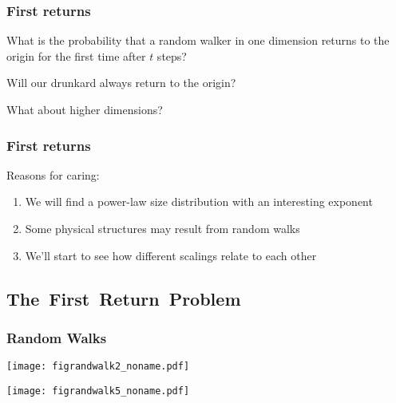 


\begin{frame}
  \frametitle{First returns}

  What is the probability that a random walker
  in one dimension returns to the origin
  for the first time after $t$ steps?

  Will our drunkard always return to the origin?

  What about higher dimensions?

\end{frame}

\begin{frame}
  \frametitle{First returns}

  \begin{block}{Reasons for caring:}
    \begin{enumerate}
    \item<2-> 
      We will find a power-law size distribution
      with an interesting exponent
    \item<3-> 
      Some physical structures may result from random walks
    \item<4-> 
      We'll start to see how different scalings relate to each other
    \end{enumerate}
  \end{block}

\end{frame}


\subsection{The\ First\ Return\ Problem}

\begin{frame}
  \frametitle{Random Walks}

  \texttt{[image: figrandwalk2\_noname.pdf]}

  \texttt{[image: figrandwalk5\_noname.pdf]}


\end{frame}


